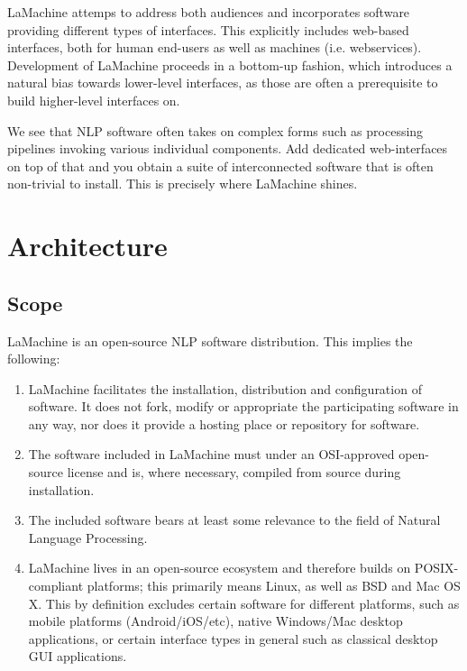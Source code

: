\documentclass[a4paper,11pt]{article}
\begin{document}
LaMachine attemps to address both audiences and incorporates software providing different types of interfaces. This
explicitly includes web-based interfaces, both for human end-users as well as machines (i.e. webservices). Development
of LaMachine proceeds in a bottom-up fashion, which introduces a natural bias towards lower-level interfaces, as those
are often a prerequisite to build higher-level interfaces on.

We see that NLP software often takes on complex forms such as processing pipelines invoking various individual
components. Add dedicated web-interfaces on top of that and you obtain a suite of interconnected software that is often
non-trivial to install. This is precisely where LaMachine shines.

\section{Architecture}

\subsection{Scope}

LaMachine is an open-source NLP software distribution. This implies the following:

\begin{enumerate}
    \item LaMachine facilitates the installation, distribution and configuration of software. It does not fork, modify
        or appropriate the participating software in any way, nor does it provide a hosting place or repository for
        software.
    \item The software included in LaMachine must under an OSI-approved open-source license and is, where necessary,
        compiled from source during installation.
    \item The included software bears at least some relevance to the field of Natural Language Processing.
    \item LaMachine lives in an open-source ecosystem and therefore builds on POSIX-compliant platforms; this primarily
        means Linux, as well as BSD and Mac OS X. This by definition excludes certain software for different platforms, such as
        mobile platforms (Android/iOS/etc), native Windows/Mac desktop applications, or certain interface types in
        general such as classical desktop GUI applications.
\end{enumerate}
\end{document}
